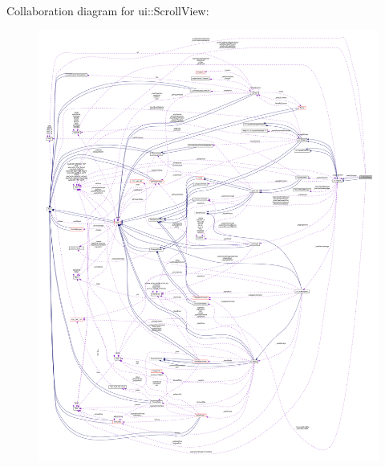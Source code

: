 Collaboration diagram for ui\+:\+:Scroll\+View\+:
\nopagebreak
\begin{figure}[H]
\begin{center}
\leavevmode
\includegraphics[width=350pt]{classui_1_1ScrollView__coll__graph}
\end{center}
\end{figure}

